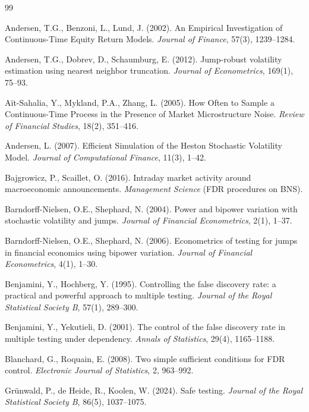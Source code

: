\documentclass[11pt,a4paper]{article}
\theoremstyle{plain}
\theoremstyle{definition}
\theoremstyle{remark}
\begin{document}
\begin{thebibliography}{99}

Andersen, T.G., Benzoni, L., Lund, J. (2002).
An Empirical Investigation of Continuous-Time Equity Return Models.
\emph{Journal of Finance}, 57(3), 1239--1284.

Andersen, T.G., Dobrev, D., Schaumburg, E. (2012).
Jump-robust volatility estimation using nearest neighbor truncation.
\emph{Journal of Econometrics}, 169(1), 75--93.

A\"it-Sahalia, Y., Mykland, P.A., Zhang, L. (2005).
How Often to Sample a Continuous-Time Process in the Presence of Market
Microstructure Noise.
\emph{Review of Financial Studies}, 18(2), 351--416.

Andersen, L. (2007).
Efficient Simulation of the Heston Stochastic Volatility Model.
\emph{Journal of Computational Finance}, 11(3), 1--42.

Bajgrowicz, P., Scaillet, O. (2016).
Intraday market activity around macroeconomic announcements.
\emph{Management Science} (FDR procedures on BNS).

Barndorff-Nielsen, O.E., Shephard, N. (2004).
Power and bipower variation with stochastic volatility and jumps.
\emph{Journal of Financial Econometrics}, 2(1), 1--37.

Barndorff-Nielsen, O.E., Shephard, N. (2006).
Econometrics of testing for jumps in financial economics using bipower
variation.
\emph{Journal of Financial Econometrics}, 4(1), 1--30.

Benjamini, Y., Hochberg, Y. (1995).
Controlling the false discovery rate: a practical and powerful approach to
multiple testing.
\emph{Journal of the Royal Statistical Society B}, 57(1), 289--300.

Benjamini, Y., Yekutieli, D. (2001).
The control of the false discovery rate in multiple testing under
dependency.
\emph{Annals of Statistics}, 29(4), 1165--1188.

Blanchard, G., Roquain, E. (2008).
Two simple sufficient conditions for FDR control.
\emph{Electronic Journal of Statistics}, 2, 963--992.

Gr\"unwald, P., de Heide, R., Koolen, W. (2024).
Safe testing.
\emph{Journal of the Royal Statistical Society B}, 86(5), 1037--1075.


\end{thebibliography}
\end{document}
